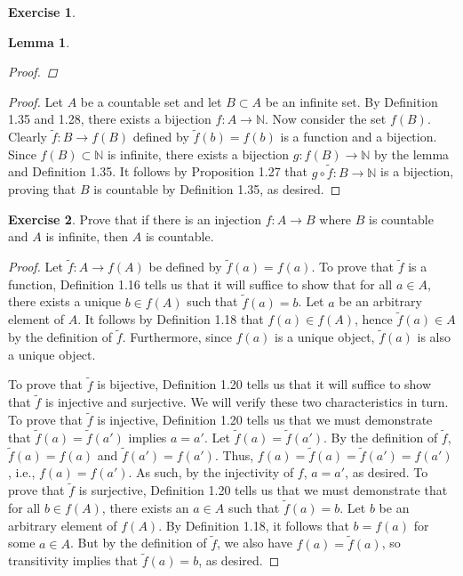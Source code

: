 \documentclass[titlepage]{article}
\newcounter{script}
\newtheorem*{lemma*}{Lemma}
\theoremstyle{definition}
\newtheorem{exercise}{Exercise}[script]
\newcommand{\N}{\mathbb{N}}
\begin{document}
\begin{exercise}
\begin{lemma*}
\begin{proof}
        \end{proof}
    \end{lemma*}
    \begin{proof}
        Let $A$ be a countable set and let $B\subset A$ be an infinite set. By Definition 1.35 and 1.28, there exists a bijection $f:A\to\N$. Now consider the set $f(B)$. Clearly $\tilde{f}:B\to f(B)$ defined by $\tilde{f}(b)=f(b)$ is a function and a bijection. Since $f(B)\subset\N$ is infinite, there exists a bijection $g:f(B)\to\N$ by the lemma and Definition 1.35. It follows by Proposition 1.27 that $g\circ\tilde{f}:B\to\N$ is a bijection, proving that $B$ is countable by Definition 1.35, as desired.
    \end{proof}
\end{exercise}

\begin{exercise}
    Prove that if there is an injection $f:A\to B$ where $B$ is countable and $A$ is infinite, then $A$ is countable.
    \begin{proof}
        Let $\tilde{f}:A\to f(A)$ be defined by $\tilde{f}(a)=f(a)$. To prove that $\tilde{f}$ is a function, Definition 1.16 tells us that it will suffice to show that for all $a\in A$, there exists a unique $b\in f(A)$ such that $\tilde{f}(a)=b$. Let $a$ be an arbitrary element of $A$. It follows by Definition 1.18 that $f(a)\in f(A)$, hence $\tilde{f}(a)\in A$ by the definition of $\tilde{f}$. Furthermore, since $f(a)$ is a unique object, $\tilde{f}(a)$ is also a unique object.\par
        To prove that $\tilde{f}$ is bijective, Definition 1.20 tells us that it will suffice to show that $\tilde{f}$ is injective and surjective. We will verify these two characteristics in turn. To prove that $\tilde{f}$ is injective, Definition 1.20 tells us that we must demonstrate that $\tilde{f}(a)=\tilde{f}(a')$ implies $a=a'$. Let $\tilde{f}(a)=\tilde{f}(a')$. By the definition of $\tilde{f}$, $\tilde{f}(a)=f(a)$ and $\tilde{f}(a')=f(a')$. Thus, $f(a)=\tilde{f}(a)=\tilde{f}(a')=f(a')$, i.e., $f(a)=f(a')$. As such, by the injectivity of $f$, $a=a'$, as desired. To prove that $\tilde{f}$ is surjective, Definition 1.20 tells us that we must demonstrate that for all $b\in f(A)$, there exists an $a\in A$ such that $\tilde{f}(a)=b$. Let $b$ be an arbitrary element of $f(A)$. By Definition 1.18, it follows that $b=f(a)$ for some $a\in A$. But by the definition of $\tilde{f}$, we also have $f(a)=\tilde{f}(a)$, so transitivity implies that $\tilde{f}(a)=b$, as desired.\par

\end{proof}
\end{exercise}
\end{document}
